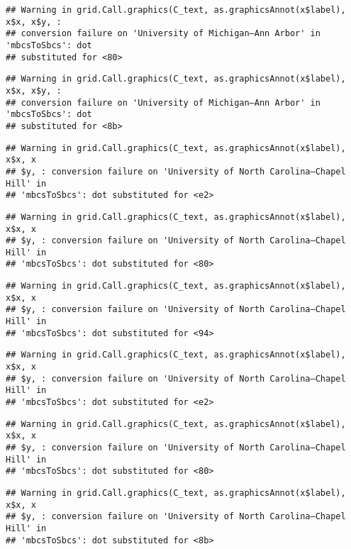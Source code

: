 \documentclass[]{article}
\begin{document}
\begin{verbatim}
## Warning in grid.Call.graphics(C_text, as.graphicsAnnot(x$label), x$x, x$y, :
## conversion failure on 'University of Michigan—​Ann Arbor' in 'mbcsToSbcs': dot
## substituted for <80>
\end{verbatim}

\begin{verbatim}
## Warning in grid.Call.graphics(C_text, as.graphicsAnnot(x$label), x$x, x$y, :
## conversion failure on 'University of Michigan—​Ann Arbor' in 'mbcsToSbcs': dot
## substituted for <8b>
\end{verbatim}

\begin{verbatim}
## Warning in grid.Call.graphics(C_text, as.graphicsAnnot(x$label), x$x, x
## $y, : conversion failure on 'University of North Carolina—​Chapel Hill' in
## 'mbcsToSbcs': dot substituted for <e2>
\end{verbatim}

\begin{verbatim}
## Warning in grid.Call.graphics(C_text, as.graphicsAnnot(x$label), x$x, x
## $y, : conversion failure on 'University of North Carolina—​Chapel Hill' in
## 'mbcsToSbcs': dot substituted for <80>
\end{verbatim}

\begin{verbatim}
## Warning in grid.Call.graphics(C_text, as.graphicsAnnot(x$label), x$x, x
## $y, : conversion failure on 'University of North Carolina—​Chapel Hill' in
## 'mbcsToSbcs': dot substituted for <94>
\end{verbatim}

\begin{verbatim}
## Warning in grid.Call.graphics(C_text, as.graphicsAnnot(x$label), x$x, x
## $y, : conversion failure on 'University of North Carolina—​Chapel Hill' in
## 'mbcsToSbcs': dot substituted for <e2>
\end{verbatim}

\begin{verbatim}
## Warning in grid.Call.graphics(C_text, as.graphicsAnnot(x$label), x$x, x
## $y, : conversion failure on 'University of North Carolina—​Chapel Hill' in
## 'mbcsToSbcs': dot substituted for <80>
\end{verbatim}

\begin{verbatim}
## Warning in grid.Call.graphics(C_text, as.graphicsAnnot(x$label), x$x, x
## $y, : conversion failure on 'University of North Carolina—​Chapel Hill' in
## 'mbcsToSbcs': dot substituted for <8b>
\end{verbatim}
\end{document}

